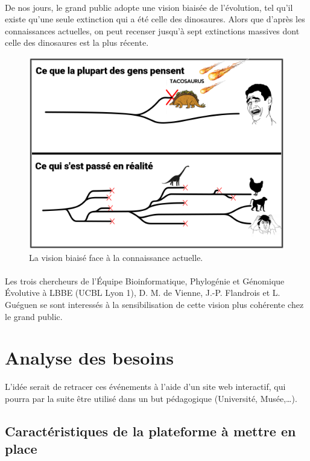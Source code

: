 \documentclass[a4paper]{article}
\begin{document}
	\paragraph{}
	De nos jours, le grand public adopte une vision biaisée de l'évolution, tel qu'il existe qu'une seule extinction qui a été celle des dinosaures. Alors que d'après les connaissances actuelles, on peut recenser jusqu'à sept extinctions massives dont celle des dinosaures est la plus récente.

	\begin{figure}[!h]
		\centering
		\includegraphics[width=12cm]{illustr1.png}
		\caption{La vision biaisé face à la connaissance actuelle.}
		\label{comic1}
	\end{figure}

	\paragraph{}
	Les trois chercheurs de l'Équipe Bioinformatique, Phylogénie et Génomique Évolutive à LBBE (UCBL Lyon 1), D. M. de Vienne, J.-P. Flandrois et L. Guéguen se sont interessés à la sensibilisation de cette vision plus cohérente chez le grand public.

\section{Analyse des besoins}

	L'idée serait de retracer ces événements à l'aide d'un site web interactif, qui pourra par la suite être utilisé dans un but pédagogique (Université, Musée,\ldots).

	\subsection{Caractéristiques de la plateforme à mettre en place}
\end{document}
